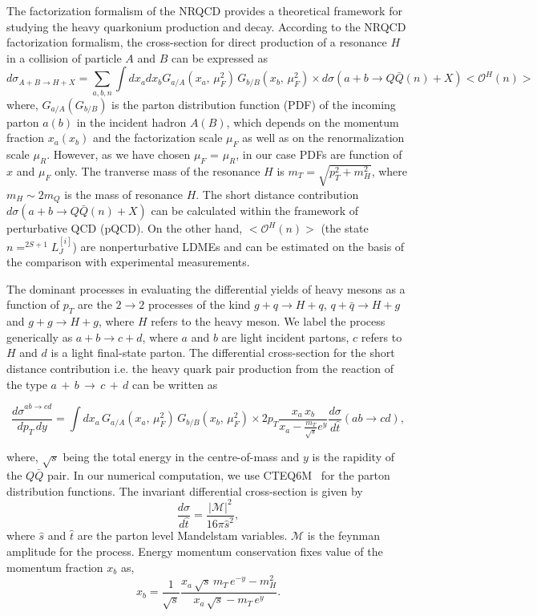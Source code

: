 \documentclass[aps,prc,preprint,superscriptaddress,showpacs,showkeys,amsmath]{revtex4-1}
\begin{document}
The factorization formalism of the NRQCD  provides a theoretical framework for studying the heavy quarkonium production and decay. 
According to the NRQCD factorization  formalism, the cross-section for direct production of a resonance $H$ in a collision of 
particle $A$ and $B$ can be expressed as 
\begin{equation}
  d\sigma_{A+B\rightarrow H+X} = \sum_{a,b,n}\int dx_a dx_b  G_{a/A}(x_a,\,\mu^{2}_{F})\, G_{b/B}(x_b,\,\mu^{2}_{F})
  \times d\sigma(a+b\rightarrow Q\bar Q(n) +X)<\mathcal{O}^H(n)>
\end{equation}
where, $G_{a/A}(G_{b/B})$ is the parton distribution function (PDF) of the incoming parton $a(b)$ in the incident hadron $A(B)$, which depends on 
the momentum fraction $x_a(x_b)$ and the factorization scale $\mu_F$ as well as on the renormalization scale $\mu_R$. However, 
as we have chosen $\mu_F$ = $\mu_R$, in our case PDFs are function of $x$ and $\mu_F$ only. The tranverse mass of the 
resonance $H$ is $m_T = \sqrt{p_T^2 + m_H^2}$, where $m_H\sim2m_Q$ is the mass of resonance $H$. The short distance 
contribution $d\sigma(a+b\rightarrow Q\bar Q(n) +X)$ can be calculated within the framework of perturbative QCD (pQCD). 
On the other hand, $<\mathcal{O}^H(n)>$ (the state $n=^{2S+1}L^{[i]}_J$) are nonperturbative LDMEs and can be estimated on the basis of 
the comparison with experimental measurements. 

The dominant processes in evaluating the differential 
yields of heavy mesons as a function of $p_T$ are the $2\rightarrow 2$
processes of the kind $g+q\rightarrow H+q$, $q+\bar{q}\rightarrow H+g$ and
$g+g\rightarrow H+g$, where $H$ refers to the heavy meson. We label the process
generically as $a+b\rightarrow c+d$, where $a$ and $b$ are light incident
partons, $c$ refers to $H$ and $d$ is a light final-state parton. The differential cross-section 
for the short distance contribution i.e. the heavy quark pair production 
from the reaction of the type $a\,+\,b\,\rightarrow\,c\,+\,d$ can be written as~\cite{Owens:1986mp}

\begin{equation}
  \frac{{d\sigma}^{ab\rightarrow cd}}{dp_T\,dy} = \int dx_a\, G_{a/A}(x_a,\,\mu^{2}_{F})\, G_{b/B}(x_b,\,\mu^{2}_{F})\times 
  2p_T \frac{x_a\,x_b}{x_a-\frac{m_T}{\sqrt{s}}e^y}\frac{d\sigma}{d\hat t}(ab\rightarrow cd),
\end{equation}

where, $\sqrt{s}$ being the total energy in the centre-of-mass and $y$ is the rapidity of 
the $Q\bar Q$ pair. In our numerical computation, we use CTEQ6M~\cite{Lai:2010vv} for the parton 
distribution functions. The invariant differential cross-section is given by
\begin{equation}
\frac{d\sigma}{d\hat t} = \frac{|\mathcal{M}|^2}{16\pi{\hat s}^2},
\end{equation}
where $\hat s$ and $\hat t$ are the parton level Mandelstam variables. $\mathcal{M}$ is the 
feynman amplitude for the process. Energy momentum conservation fixes value of the momentum 
fraction $x_b$ as,
\begin{equation}
x_b = \frac{1}{\sqrt{s}}\frac{x_a\,\sqrt{s}\,m_T\,e^{-y}-m^2_H}{x_a\,\sqrt{s}-m_T\,e^y}.
\end{equation}
\end{document}
